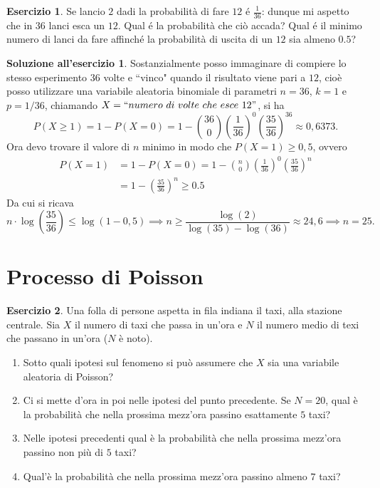 \documentclass[12pt,a4paper]{article}
\theoremstyle{definition}
\newtheorem{sol}{Soluzione all'esercizio}
\newtheorem{exe}{Esercizio}
\begin{document}
\begin{exe}
	Se lancio $ 2 $ dadi la probabilità di fare $ 12 $ é $ \frac{1}{36} $: dunque mi aspetto che in $ 36 $ lanci esca un $ 12 $. Qual é la probabilità che ciò accada? Qual é il minimo numero di lanci da fare affinché la probabilità di uscita di un $ 12 $ sia almeno $ 0.5 $?
\end{exe}

\begin{sol}
	Sostanzialmente posso immaginare di compiere lo stesso esperimento $ 36 $ volte e ``vinco" quando il risultato viene pari a $ 12 $, cioè posso utilizzare una variabile aleatoria binomiale di parametri $ n=36 $, $ k=1 $ e $ p=1/36 $, chiamando $ X = ``numero\ di \ volte\ che\ esce\ 12" $, si ha
	\[ P(X\ge1) = 1 -P(X=0) = 1- \binom{36}{0}\left( \frac{1}{36}\right)^{0}\left( \frac{35}{36}\right)^{36} \approx 0,6373.  \]
	Ora devo trovare il valore di $ n $ minimo in modo che $ P(X=1) \ge 0,5 $, ovvero
	\[  \begin{split}
			P(X=1) & = 1 -P(X=0) = 1- \binom{n}{0}\left( \frac{1}{36}\right)^{0}\left( \frac{35}{36}\right)^{n} \\
			       & = 1 -  \left( \frac{35}{36}\right)^{n} \ge 0.5
		\end{split} \]
	Da cui si ricava
	\[ n\cdot \log\left( \frac{35}{36}\right) \le \log(1-0,5) \implies n\ge \frac{\log(2)}{\log(35) - \log(36)}\approx 24,6 \implies n=25.  \]
\end{sol}

\section{Processo di Poisson}
\begin{exe} Una folla di persone aspetta in fila indiana il taxi, alla stazione centrale. Sia $ X $ il numero di taxi che passa in un'ora e $ N $ il numero medio di texi che passano in un'ora ($ N $ è noto).
	\begin{enumerate}
		\item Sotto quali ipotesi sul fenomeno si può assumere che $ X $ sia una variabile aleatoria di Poisson?
		\item Ci si mette d'ora in poi nelle ipotesi del punto precedente. Se $ N = 20 $, qual è la probabilità che nella prossima mezz'ora passino esattamente $ 5 $ taxi?
		\item Nelle ipotesi precedenti qual è la probabilità che nella prossima mezz'ora passino non più di $ 5 $ taxi?
		\item  Qual'è la probabilità che nella prossima mezz'ora passino almeno $ 7 $ taxi?
	\end{enumerate}
\end{exe}
\end{document}

